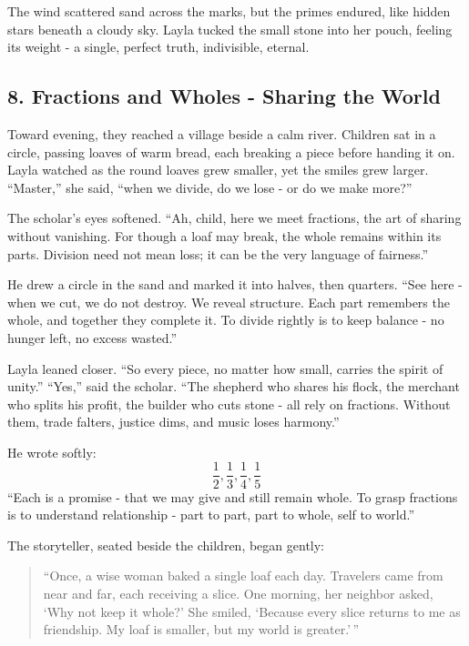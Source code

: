 \documentclass[
  letterpaper,
  DIV=11,
  numbers=noendperiod]{scrreprt}
\begin{document}
The wind scattered sand across the marks, but the primes endured, like
hidden stars beneath a cloudy sky. Layla tucked the small stone into her
pouch, feeling its weight - a single, perfect truth, indivisible,
eternal.

\subsection{8. Fractions and Wholes - Sharing the
World}\label{fractions-and-wholes---sharing-the-world}

Toward evening, they reached a village beside a calm river. Children sat
in a circle, passing loaves of warm bread, each breaking a piece before
handing it on. Layla watched as the round loaves grew smaller, yet the
smiles grew larger. ``Master,'' she said, ``when we divide, do we lose -
or do we make more?''

The scholar's eyes softened. ``Ah, child, here we meet fractions, the
art of sharing without vanishing. For though a loaf may break, the whole
remains within its parts. Division need not mean loss; it can be the
very language of fairness.''

He drew a circle in the sand and marked it into halves, then quarters.
``See here - when we cut, we do not destroy. We reveal structure. Each
part remembers the whole, and together they complete it. To divide
rightly is to keep balance - no hunger left, no excess wasted.''

Layla leaned closer. ``So every piece, no matter how small, carries the
spirit of unity.'' ``Yes,'' said the scholar. ``The shepherd who shares
his flock, the merchant who splits his profit, the builder who cuts
stone - all rely on fractions. Without them, trade falters, justice
dims, and music loses harmony.''

He wrote softly: \[
\frac{1}{2}, \frac{1}{3}, \frac{1}{4}, \frac{1}{5}
\] ``Each is a promise - that we may give and still remain whole. To
grasp fractions is to understand relationship - part to part, part to
whole, self to world.''

The storyteller, seated beside the children, began gently:

\begin{quote}
``Once, a wise woman baked a single loaf each day. Travelers came from
near and far, each receiving a slice. One morning, her neighbor asked,
`Why not keep it whole?' She smiled, `Because every slice returns to me
as friendship. My loaf is smaller, but my world is greater.'\,''
\end{quote}
\end{document}
